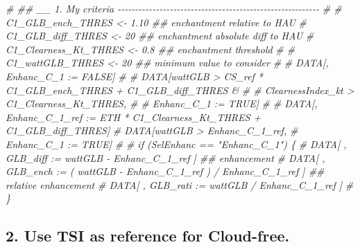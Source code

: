\documentclass[
  10pt,
  a4paper,oneside]{article}
\newenvironment{Shaded}{\begin{snugshade}}{\end{snugshade}}
\newcommand{\CommentTok}[1]{\textcolor[rgb]{0.56,0.35,0.01}{\textit{#1}}}
\begin{document}
\begin{Shaded}
\begin{Highlighting}[]
\CommentTok{\# \#\# \_\_ 1. My criteria  {-}{-}{-}{-}{-}{-}{-}{-}{-}{-}{-}{-}{-}{-}{-}{-}{-}{-}{-}{-}{-}{-}{-}{-}{-}{-}{-}{-}{-}{-}{-}{-}{-}{-}{-}{-}{-}{-}{-}{-}{-}{-}{-}{-}{-}{-}{-}{-}{-}{-}{-}{-}{-}{-}{-}{-}{-}{-}}
\CommentTok{\# \# C1\_GLB\_ench\_THRES     \textless{}{-}  1.10 \#\# enchantment relative to HAU}
\CommentTok{\# C1\_GLB\_diff\_THRES     \textless{}{-} 20    \#\# enchantment absolute diff to HAU}
\CommentTok{\# C1\_Clearness\_Kt\_THRES \textless{}{-}  0.8  \#\# enchantment threshold}
\CommentTok{\# \# C1\_wattGLB\_THRES      \textless{}{-} 20    \#\# minimum value to consider}
\CommentTok{\#}
\CommentTok{\# DATA[, Enhanc\_C\_1 := FALSE]}
\CommentTok{\# \# DATA[wattGLB           \textgreater{} CS\_ref * C1\_GLB\_ench\_THRES + C1\_GLB\_diff\_THRES \&}
\CommentTok{\# \#      ClearnessIndex\_kt \textgreater{} C1\_Clearness\_Kt\_THRES,}
\CommentTok{\# \#      Enhanc\_C\_1 := TRUE]}
\CommentTok{\#}
\CommentTok{\# DATA[, Enhanc\_C\_1\_ref := ETH * C1\_Clearness\_Kt\_THRES + C1\_GLB\_diff\_THRES]}
\CommentTok{\# DATA[wattGLB \textgreater{} Enhanc\_C\_1\_ref,}
\CommentTok{\#      Enhanc\_C\_1 := TRUE]}
\CommentTok{\#}
\CommentTok{\# if (SelEnhanc == "Enhanc\_C\_1") \{}
\CommentTok{\#   DATA[ , GLB\_diff :=   wattGLB {-} Enhanc\_C\_1\_ref                    ] \#\# enhancement}
\CommentTok{\#   DATA[ , GLB\_ench := ( wattGLB {-} Enhanc\_C\_1\_ref ) / Enhanc\_C\_1\_ref ] \#\# relative enhancement}
\CommentTok{\#   DATA[ , GLB\_rati :=   wattGLB / Enhanc\_C\_1\_ref                    ]}
\CommentTok{\# \}}
\end{Highlighting}
\end{Shaded}

\hypertarget{use-tsi-as-reference-for-cloud-free.-1}{%
\subsection{2. Use TSI as reference for Cloud-free.}\label{use-tsi-as-reference-for-cloud-free.-1}}
\end{document}
